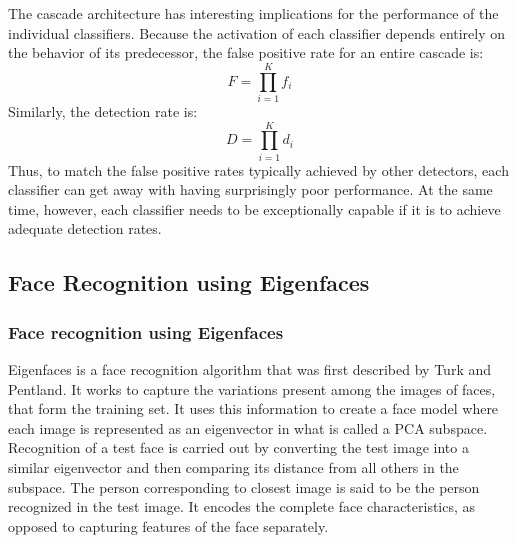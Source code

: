 \documentclass[%
        final,
        notitlepage,
        narroweqnarray,
        inline,
        ]{ieee}
\begin{document}
The cascade architecture has interesting implications for the performance of the individual classifiers. Because the activation of each classifier depends entirely on the behavior of its predecessor, the false positive rate for an entire cascade is:
\begin{equation}
F = \prod _{i=1}^{K} f_i
\end{equation}
Similarly, the detection rate is:
\begin{equation}
D = \prod _{i=1}^{K} d_i
\end{equation}
Thus, to match the false positive rates typically achieved by other detectors, each classifier can get away with having surprisingly poor performance. At the same time, however, each classifier needs to be exceptionally capable if it is to achieve adequate detection rates.

\subsection{Face Recognition using Eigenfaces}

\subsubsection{Face recognition using Eigenfaces}
Eigenfaces is a face recognition algorithm that was first described by Turk and Pentland\cite{Turk91}. It works to capture the variations present among the images of faces, that form the training set. It uses this information to create a face model where each image is represented as an eigenvector in what is called a PCA subspace. Recognition of a test face is carried out by converting the test image into a similar eigenvector and then comparing its distance from all others in the subspace. The person corresponding to closest image is said to be the person recognized in the test image. It encodes the complete face characteristics, as opposed to capturing features of the face separately.\\
\end{document}
